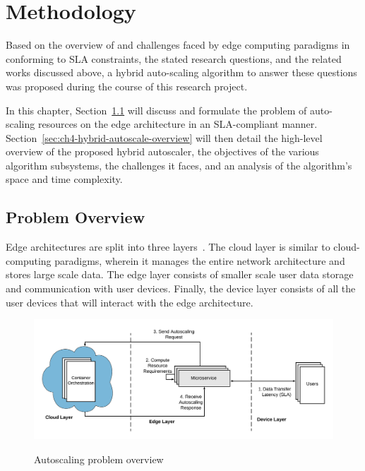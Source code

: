 \clearpage

\def\chaptertitle{Methodology}

\lhead{\emph{\chaptertitle}}

\chapter{\chaptertitle}
\label{ch:methodology}

Based on the overview of and challenges faced by edge computing paradigms in conforming to SLA constraints, the stated research questions, and the related works discussed above, a hybrid auto-scaling algorithm to answer these questions was proposed during the course of this research project.\par

In this chapter, Section~\ref{sec:ch4-problem-overview} will discuss and formulate the problem of auto-scaling resources on the edge architecture in an SLA-compliant manner. Section~\ref{sec:ch4-hybrid-autoscale-overview} will then detail the high-level overview of the proposed hybrid autoscaler, the objectives of the various algorithm subsystems, the challenges it faces, and an analysis of the algorithm's space and time complexity.

\section{Problem Overview}
\label{sec:ch4-problem-overview}

Edge architectures are split into three layers~\cite{hamdan2020edge}. 
The cloud layer is similar to cloud-computing paradigms, wherein it manages the entire network architecture and stores large scale data. The edge layer consists of smaller scale user data storage and communication with user devices. Finally, the device layer consists of all the user devices that will interact with the edge architecture.\par

\begin{figure}[htb]
    \centering
    \caption{Autoscaling problem overview}
    \includegraphics[width=1.0\linewidth]{Figures/Problem-Overview.pdf}
    \label{fig:autoscaling-problem-overview}
\end{figure}

